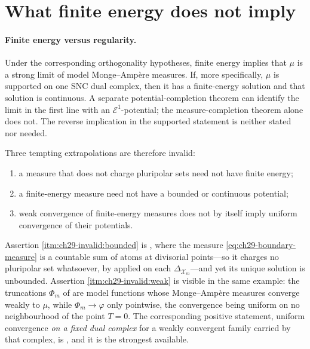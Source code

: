 \section{What finite energy does not imply}

\paragraph{Finite energy versus regularity.}
Under the corresponding orthogonality hypotheses, finite energy implies
that \(\mu\) is a strong limit of model Monge--Amp\`ere measures.  If,
more specifically, \(\mu\) is supported on one SNC dual complex, then it
has a finite-energy solution and that solution is continuous.  A separate
potential-completion theorem can identify the limit in the first line with
an \(\mathcal E^1\)-potential; the measure-completion theorem alone does not.
The reverse implication in the supported statement is neither stated nor
needed.

Three tempting extrapolations are therefore invalid:
\begin{enumerate}
\item\label{itm:ch29-invalid:polar}
      a measure that does not charge pluripolar sets need not have finite
      energy;
\item\label{itm:ch29-invalid:bounded}
      a finite-energy measure need not have a bounded or continuous
      potential;
\item\label{itm:ch29-invalid:weak}
      weak convergence of finite-energy measures does not by itself imply
      uniform convergence of their potentials.
\end{enumerate}

Assertion \cref{itm:ch29-invalid:bounded} is
, where the measure
\eqref{eq:ch29-boundary-measure} is a countable sum of atoms at divisorial
points---so it charges no pluripolar set whatsoever, by
 applied on each
\(\Delta_{\mathcal X_m}\)---and yet its unique solution is unbounded.
Assertion \cref{itm:ch29-invalid:weak} is visible in the same example: the
truncations \(\Phi_m\) of  are model
functions whose Monge--Amp\`ere measures converge weakly to \(\mu\), while
\(\Phi_m\to\varphi\) only pointwise, the convergence being uniform on no
neighbourhood of the point \(T=0\).  The corresponding positive statement,
uniform convergence \emph{on a fixed dual complex} for a weakly convergent
family carried by that complex, is
, and it is the strongest available.

